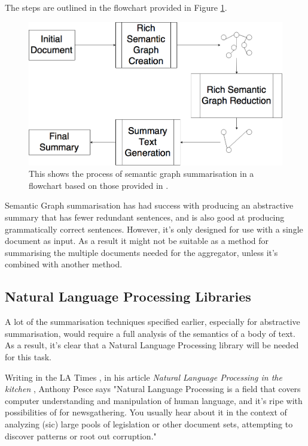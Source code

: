 \documentclass[12pt]{article}
\begin{document}
The steps are outlined in the flowchart provided in Figure \ref{semanticGraphSummarisation}.

\begin{figure}[ht!]
  \centering
    \includegraphics[scale=0.4]{SemanticGraphSummarisation.png}
   \caption[A flowchart showing the process of semantic graph summarisation]{This shows the process of semantic graph summarisation in a flowchart based on those provided in  \cite{abstractiveTechniques, abstractiveTechniquesOriginal}.}
   \label{semanticGraphSummarisation}
\end{figure}

Semantic Graph summarisation has had success with producing an abstractive summary that has fewer redundant sentences, and is also good at producing grammatically correct sentences. However, it's only designed for use with a single document as input. As a result it might not be suitable as a method for summarising the multiple documents needed for the aggregator, unless it's combined with another method.

\subsection{Natural Language Processing Libraries} 

A lot of the summarisation techniques specified earlier, especially for abstractive summarisation, would require a full analysis of the semantics of a body of text. As a result, it's clear that a Natural Language Processing library will be needed for this task.

Writing in the LA Times \cite{latimes}, in his article \emph{Natural Language Processing in the kitchen} \cite{nlpkitchen}, Anthony Pesce says "Natural Language Processing is a field that covers computer understanding and manipulation of human language, and it's ripe with possibilities of for newsgathering. You usually hear about it in the context of analyzing (sic) large pools of legislation or other document sets, attempting to discover patterns or root out corruption."
\end{document}
